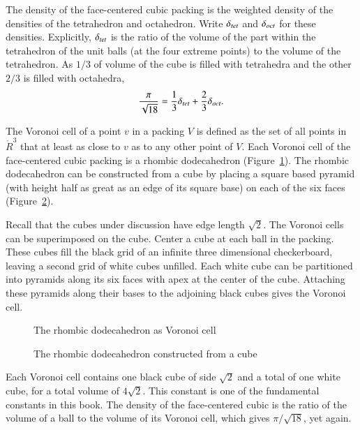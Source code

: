 The density of the face-centered cubic packing is the weighted density
of the densities of the tetrahedron and octahedron.  Write $\delta_{tet}$ and
$\delta_{oct}$ for these densities.  Explicitly, $\delta_{tet}$ is the ratio of the
volume of the part within the tetrahedron of the unit balls (at the
four extreme points) to the volume of the tetrahedron.  As $1/3$ of volume of the cube is
filled with tetrahedra and the other $2/3$ is filled with octahedra,
\begin{displaymath}
  \frac{\pi}{\sqrt{18}} = \frac{1}{3}\delta_{tet} + \frac{2}{3}\delta_{oct}.
\end{displaymath}

The Voronoi cell of a point $v$ in a packing $V$ is defined as the set of all
points in $\ring{R}^3$ 
that at least as close to $v$ as to any other point
of $V$.  Each Voronoi cell of the face-centered cubic packing is a
rhombic dodecahedron (Figure~\ref{fig:rhombic}).  %
The rhombic dodecahedron can be constructed from a cube by placing a
square based pyramid (with height half as great as an edge of its
square base) on each of the six faces
(Figure~\ref{fig:rhombic-cube}).  %

Recall that the cubes under discussion  have edge length
$\sqrt{2}$.
The Voronoi cells can be superimposed on the cube.
Center a cube at each ball in the packing. These
cubes fill the black grid of an infinite three dimensional
checkerboard, leaving a second grid of white cubes unfilled.  Each
white cube can be partitioned into pyramids along its six faces with apex
at the center of the cube.  Attaching these pyramids along their bases
to the adjoining black cubes gives the Voronoi cell.

\begin{figure}[htb]
  \centering
  \caption{The rhombic dodecahedron as Voronoi cell}
  \label{fig:rhombic}
\end{figure}

\begin{figure}[htb]
  \centering
  \caption{The rhombic dodecahedron constructed from a cube}
  \label{fig:rhombic-cube}
\end{figure}

Each Voronoi cell contains one black cube of side $\sqrt2$ and a total
of one white cube, for a total volume of $4\sqrt2$.  This constant is
one of the fundamental constants in this book.  The density of the
face-centered cubic is the ratio of the volume of a ball to the volume
of its Voronoi cell, which gives $\pi/\sqrt{18}$, yet again.





